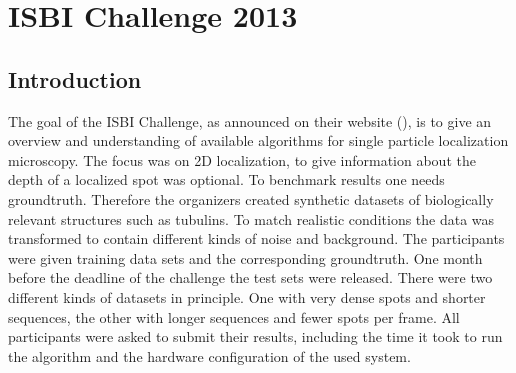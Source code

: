 \chapter{ISBI Challenge 2013}
\section{Introduction}
The goal of the ISBI Challenge, as announced on their website (\cite{challenge}), is to give an overview and understanding of available algorithms for single particle localization microscopy. The focus was on 2D localization, to give information about the depth of a localized spot was optional. To benchmark results one needs groundtruth. Therefore the organizers created synthetic datasets of biologically relevant structures such as tubulins. To match realistic conditions the data was transformed to contain different kinds of noise and background.\newline
The participants were given training data sets and the corresponding groundtruth. One month before the deadline of the challenge the test sets were released. There were two different kinds of datasets in principle. One with very dense spots and shorter sequences, the other with longer sequences and fewer spots per frame.\newline
All participants were asked to submit their results, including the time it took to run the algorithm and the hardware configuration of the used system.

